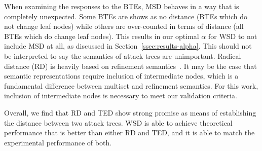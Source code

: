 When examining the responses to the BTEs, MSD behaves in a way that is completely unexpected. Some BTEs are shows as no distance (BTEs which do not change leaf nodes) while others are over-counted in terms of distance (all BTEs which do change leaf nodes). This results in our optimal $\alpha$ for WSD to not include MSD at all, as discussed in Section~\ref{ssec:results-alpha}. This should not be interpreted to say the semantics of attack trees are unimportant. Radical distance (RD) is heavily based on refinement semantics~\cite{gadyatskayaRefinementAwareGenerationAttack2017}. It may be the case that semantic representations require inclusion of intermediate nodes, which is a fundamental difference between multiset and refinement semantics. For this work, inclusion of intermediate nodes is necessary to meet our validation criteria.






Overall, we find that RD and TED show strong promise as means of establishing the distance between two attack trees. WSD is able to achieve theoretical performance that is better than either RD and TED, and it is able to match the experimental performance of both.


















































































